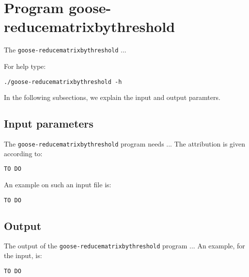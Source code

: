 \section{Program goose-reducematrixbythreshold}
The \texttt{goose-reducematrixbythreshold} ...

For help type:
\begin{lstlisting}
./goose-reducematrixbythreshold -h
\end{lstlisting}
In the following subsections, we explain the input and output paramters.

\subsection*{Input parameters}

The \texttt{goose-reducematrixbythreshold} program needs ...
The attribution is given according to:
\begin{lstlisting}
TO DO
\end{lstlisting}

An example on such an input file is:
\begin{lstlisting}
TO DO
\end{lstlisting}

\subsection*{Output}
The output of the \texttt{goose-reducematrixbythreshold} program ...
An example, for the input, is:
\begin{lstlisting}
TO DO
\end{lstlisting}
